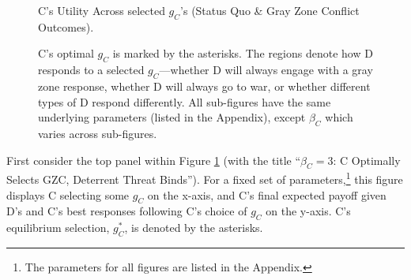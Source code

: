 \documentclass[11pt,letterpaper,pdftex,dvipsnames,table]{article}
\begin{document}
\begin{figure}

\caption{C's Utility Across selected $g_C$'s (Status Quo \& Gray Zone Conflict Outcomes).}\label{constraints1}
\caption*{ C's optimal $g_C$ is marked by the asterisks. The regions denote how D responds to a selected $g_C$---whether D will always engage with a gray zone response, whether D will always go to war, or whether different types of D respond differently. All sub-figures have the same underlying parameters (listed in the Appendix), except $\beta_C$ which varies across sub-figures.}
\end{figure}

First consider the top panel within Figure \ref{constraints1} (with the title ``$\beta_{C}=3$: C Optimally Selects GZC, Deterrent Threat Binds''). For a fixed set of parameters,\footnote{The parameters for all figures are listed in the Appendix.} this figure displays C selecting some $g_{C}$ on the x-axis, and C's final expected payoff given D's and C's best responses following C's choice of $g_C$ on the y-axis. C's equilibrium  selection, $g_C^*$, is denoted by the asterisks. 
\end{document}
